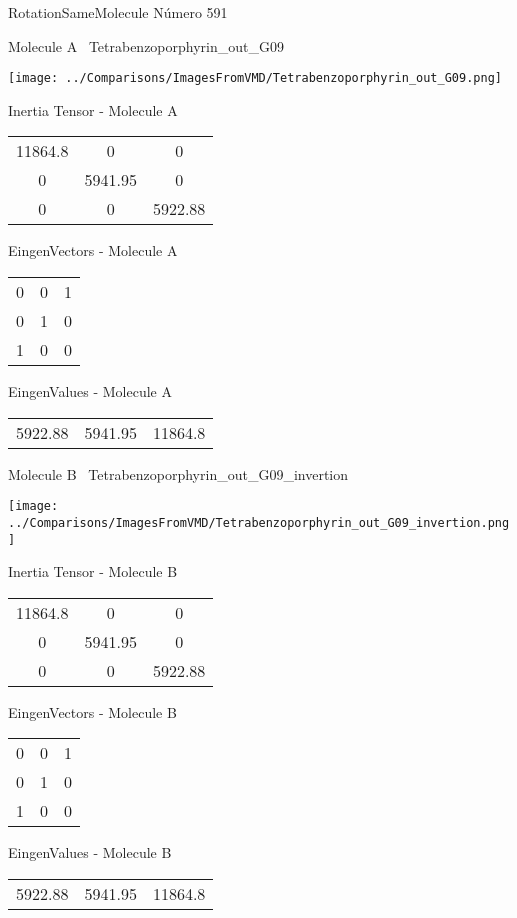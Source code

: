 \vtab[-3cm]
\begin{center}
{\large RotationSameMolecule \tab Número 591}
\end{center}
\begin{multicols}{2}
\begin{center}

Molecule A \
Tetrabenzoporphyrin\_out\_G09

\texttt{[image: ../Comparisons/ImagesFromVMD/Tetrabenzoporphyrin\_out\_G09.png]}

Inertia Tensor - Molecule A \\
\begin{tabular}{|c c c|}
11864.8	 & 	0	 & 	0	 \\
0	 & 	5941.95	 & 	0	 \\
0	 & 	0	 & 	5922.88
\end{tabular}

\vtab
 EingenVectors - Molecule A     \\
\begin{tabular}{|c c c|}
0	 & 	0	 & 	1	 \\
0	 & 	1	 & 	0	 \\
1	 & 	0	 & 	0
\end{tabular}

\vtab
 EingenValues - Molecule A     \\
\begin{tabular}{|c c c|}
5922.88	 & 	5941.95	 & 	11864.8	 \\
\end{tabular}
\columnbreak

Molecule B \
Tetrabenzoporphyrin\_out\_G09\_invertion

\texttt{[image: ../Comparisons/ImagesFromVMD/Tetrabenzoporphyrin\_out\_G09\_invertion.png]}

Inertia Tensor - Molecule B \\
\begin{tabular}{|c c c|}
11864.8	 & 	0	 & 	0	 \\
0	 & 	5941.95	 & 	0	 \\
0	 & 	0	 & 	5922.88
\end{tabular}

\vtab
 EingenVectors - Molecule B     \\
\begin{tabular}{|c c c|}
0	 & 	0	 & 	1	 \\
0	 & 	1	 & 	0	 \\
1	 & 	0	 & 	0
\end{tabular}

\vtab
 EingenValues - Molecule B     \\
\begin{tabular}{|c c c|}
5922.88	 & 	5941.95	 & 	11864.8	 \\
\end{tabular}

\end{center}
\end{multicols}

